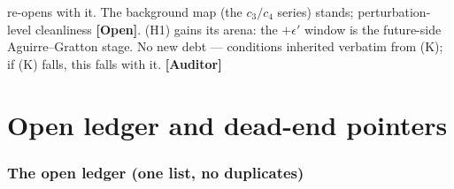 \documentclass[11pt]{article}
\newcommand{\Auditor}{\textbf{\textcolor{teal!55!black}{[Auditor]}}}
\newcommand{\open}{\textcolor{red!70!black}{\textbf{[Open]}}}
\begin{document}
re-opens with it. The background map (the $c_3/c_4$ series) stands; perturbation-level cleanliness \open. (H1) gains its arena: the $+\epsilon'$ window is the future-side Aguirre--Gratton stage. No new debt --- conditions inherited verbatim from (K); if (K) falls, this falls with it. \Auditor

\clearpage
\part{Open ledger and dead-end pointers}
\setcounter{section}{0}\setcounter{equation}{0}\setcounter{figure}{0}

\section{The open ledger (one list, no duplicates)}
\end{document}
